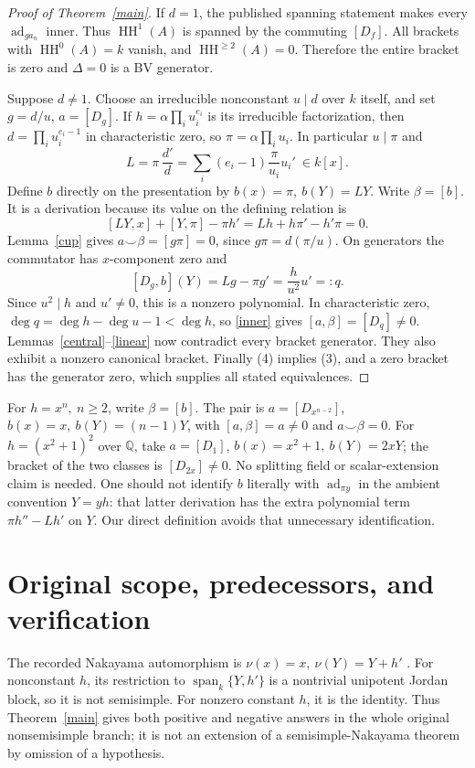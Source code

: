 \documentclass[11pt]{article}
\theoremstyle{remark}\newtheorem{remark}[theorem]{Remark}
\newcommand{\HH}{\operatorname{HH}}
\newcommand{\ad}{\operatorname{ad}}
\begin{document}
\begin{proof}[Proof of Theorem~\ref{main}]
If \(d=1\), the published spanning statement makes every
\(\ad_{g a_n}\) inner. Thus \(\HH^1(A)\) is spanned by the commuting
\([D_f]\). All brackets with \(\HH^0(A)=k\) vanish, and
\(\HH^{\ge2}(A)=0\). Therefore the entire bracket is zero and
\(\Delta=0\) is a BV generator.

Suppose \(d\ne1\). Choose an irreducible nonconstant \(u\mid d\)
over \(k\) itself, and set \(g=d/u\), \(a=[D_g]\).
If \(h=\alpha\prod_i u_i^{e_i}\) is its irreducible factorization, then
\(d=\prod_i u_i^{e_i-1}\) in characteristic zero, so
\(\pi=\alpha\prod_i u_i\).
In particular \(u\mid\pi\) and
\[
 L=\pi\,\frac{d'}d
   =\sum_i(e_i-1)\frac{\pi}{u_i}u_i'\ \in k[x].
\]
Define \(b\) directly on the presentation by
\(b(x)=\pi,\ b(Y)=LY\).
Write \(\beta=[b]\). It is a derivation because its value on the defining relation is
\[
 [LY,x]+[Y,\pi]-\pi h'
 =Lh+h\pi'-h'\pi=0.
\]
Lemma~\ref{cup} gives \(a\smile\beta=[g\pi]=0\), since
\(g\pi=d(\pi/u)\).
On generators the commutator has \(x\)-component zero and
\[
 [D_g,b](Y)=Lg-\pi g'
   =\frac{h}{u^2}u'=:q.
\]
Since \(u^2\mid h\) and \(u'\ne0\), this is a nonzero polynomial.
In characteristic zero,
\(\deg q=\deg h-\deg u-1<\deg h\), so \eqref{inner} gives
\([a,\beta]=[D_q]\ne0\).
Lemmas~\ref{central}--\ref{linear} now contradict every bracket
generator. They also exhibit a nonzero canonical bracket.
Finally (4) implies (3), and a zero bracket has the generator zero,
which supplies all stated equivalences.
\end{proof}

For \(h=x^n,\ n\ge2\), write \(\beta=[b]\). The pair is
\(a=[D_{x^{n-2}}]\), \(b(x)=x,\ b(Y)=(n-1)Y\), with
\([a,\beta]=a\ne0\) and \(a\smile\beta=0\).
For \(h=(x^2+1)^2\) over \(\mathbb Q\), take
\(a=[D_1]\), \(b(x)=x^2+1,\ b(Y)=2xY\);
the bracket of the two classes is \([D_{2x}]\ne0\).
No splitting field or scalar-extension claim is needed.
One should not identify \(b\) literally with \(\ad_{\pi y}\) in the
ambient convention \(Y=yh\): that latter derivation has the extra
polynomial term \(\pi h''-Lh'\) on \(Y\).
Our direct definition avoids that unnecessary identification.

\section{Original scope, predecessors, and verification}\label{scope}
The recorded Nakayama automorphism is
\(\nu(x)=x,\ \nu(Y)=Y+h'\)
\cite[p.~1381]{LS}. For nonconstant \(h\), its restriction to
\(\operatorname{span}_k\{Y,h'\}\) is a nontrivial unipotent Jordan block,
so it is not semisimple. For nonzero constant \(h\), it is the identity.
Thus Theorem~\ref{main} gives both positive and negative answers in the
whole original nonsemisimple branch; it is not an extension of a
semisimple-Nakayama theorem by omission of a hypothesis.
\end{document}
